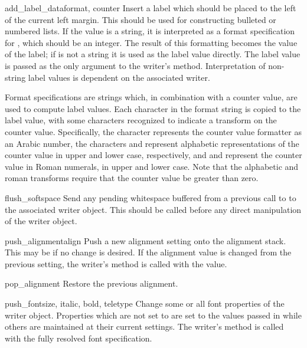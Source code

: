 \begin{methoddesc}[formatter]{add_label_data}{format, counter}
Insert a label which should be placed to the left of the current left
margin.  This should be used for constructing bulleted or numbered
lists.  If the  value is a string, it is interpreted as a
format specification for , which should be an integer.
The result of this formatting becomes the value of the label; if
 is not a string it is used as the label value directly.
The label value is passed as the only argument to the writer's
 method.  Interpretation of non-string label
values is dependent on the associated writer.

Format specifications are strings which, in combination with a counter
value, are used to compute label values.  Each character in the format
string is copied to the label value, with some characters recognized
to indicate a transform on the counter value.  Specifically, the
character  represents the counter value formatter as an
Arabic number, the characters  and 
represent alphabetic representations of the counter value in upper and
lower case, respectively, and  and 
represent the counter value in Roman numerals, in upper and lower
case.  Note that the alphabetic and roman transforms require that the
counter value be greater than zero.
\end{methoddesc}

\begin{methoddesc}[formatter]{flush_softspace}{}
Send any pending whitespace buffered from a previous call to
 to the associated writer object.  This
should be called before any direct manipulation of the writer object.
\end{methoddesc}

\begin{methoddesc}[formatter]{push_alignment}{align}
Push a new alignment setting onto the alignment stack.  This may be
 if no change is desired.  If the alignment value is
changed from the previous setting, the writer's 
method is called with the  value.
\end{methoddesc}

\begin{methoddesc}[formatter]{pop_alignment}{}
Restore the previous alignment.
\end{methoddesc}

\begin{methoddesc}[formatter]{push_font}{\code{(}size, italic, bold, teletype\code{)}}
Change some or all font properties of the writer object.  Properties
which are not set to  are set to the values passed in
while others are maintained at their current settings.  The writer's
 method is called with the fully resolved font
specification.
\end{methoddesc}

